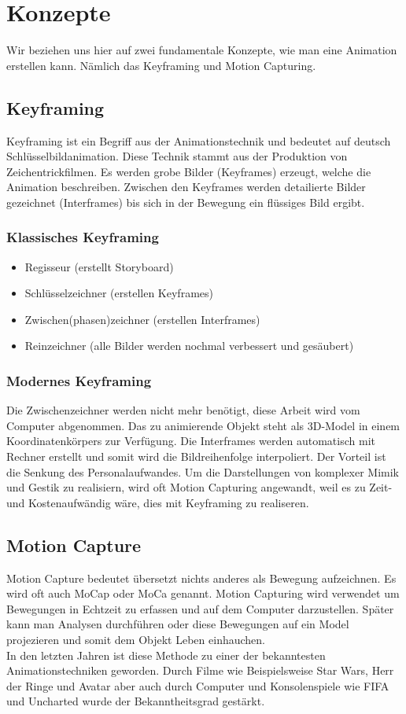 \chapter{Konzepte}
Wir beziehen uns hier auf zwei fundamentale Konzepte, wie man eine Animation erstellen kann. Nämlich das Keyframing und Motion Capturing. 

\section{Keyframing}
Keyframing ist ein Begriff aus der Animationstechnik und bedeutet auf deutsch Schlüsselbildanimation. Diese Technik stammt aus der Produktion von Zeichentrickfilmen. Es werden grobe Bilder (Keyframes) erzeugt, welche die Animation beschreiben. Zwischen den Keyframes werden detailierte Bilder gezeichnet (Interframes) bis sich in der Bewegung ein flüssiges Bild ergibt.

\subsection{Klassisches Keyframing}
\begin{itemize}
\item Regisseur (erstellt Storyboard)
\item Schlüsselzeichner (erstellen Keyframes)
\item Zwischen(phasen)zeichner (erstellen Interframes)
\item Reinzeichner (alle Bilder werden nochmal verbessert und gesäubert)
\end{itemize}

\subsection{Modernes Keyframing}
Die Zwischenzeichner werden nicht mehr benötigt, diese Arbeit wird vom Computer abgenommen. Das zu animierende Objekt steht als 3D-Model in einem Koordinatenkörpers zur Verfügung. Die Interframes werden automatisch mit Rechner erstellt und somit wird die Bildreihenfolge interpoliert. Der Vorteil ist die Senkung des Personalaufwandes. Um die Darstellungen von komplexer Mimik und Gestik zu realisiern,  wird oft Motion Capturing angewandt, weil es zu Zeit- und Kostenaufwändig wäre, dies mit Keyframing zu realiseren. 


\section{Motion Capture}
Motion Capture bedeutet übersetzt nichts anderes als Bewegung aufzeichnen. 
Es wird oft auch MoCap oder MoCa genannt. Motion Capturing wird verwendet 
um Bewegungen in Echtzeit zu erfassen und auf dem Computer darzustellen. 
Später kann man Analysen durchführen oder diese Bewegungen auf ein Model 
projezieren und somit dem Objekt Leben einhauchen. \\
In den letzten Jahren ist diese Methode zu einer der bekanntesten Animationstechniken geworden. 
Durch Filme wie Beispielsweise Star Wars, Herr der Ringe und Avatar aber 
auch durch Computer und Konsolenspiele wie FIFA und Uncharted  
wurde der Bekanntheitsgrad gestärkt.    

